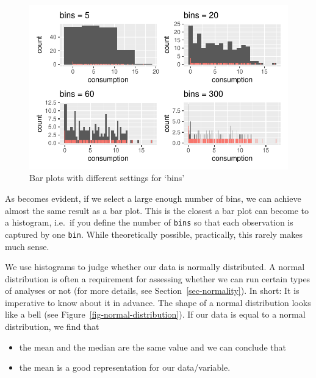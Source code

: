 \documentclass[
  letterpaper,
]{krantz}
\begin{document}
\begin{figure}[H]

{\centering \includegraphics{08_descriptive_statistics_files/figure-latex/histograms-bins-output-1.pdf}

}

\caption{Bar plots with different settings for `bins'}

\end{figure}%

As becomes evident, if we select a large enough number of bins, we can
achieve almost the same result as a bar plot. This is the closest a bar
plot can become to a histogram, i.e.~if you define the number of
\texttt{bins} so that each observation is captured by one \texttt{bin}.
While theoretically possible, practically, this rarely makes much sense.

We use histograms to judge whether our data is normally distributed. A
normal distribution is often a requirement for assessing whether we can
run certain types of analyses or not (for more details, see
Section~\ref{sec-normality}). In short: It is imperative to know about
it in advance. The shape of a normal distribution looks like a bell (see
Figure~\ref{fig-normal-distribution}). If our data is equal to a normal
distribution, we find that

\begin{itemize}
\item
  the mean and the median are the same value and we can conclude that
\item
  the mean is a good representation for our data/variable.
\end{itemize}
\end{document}
